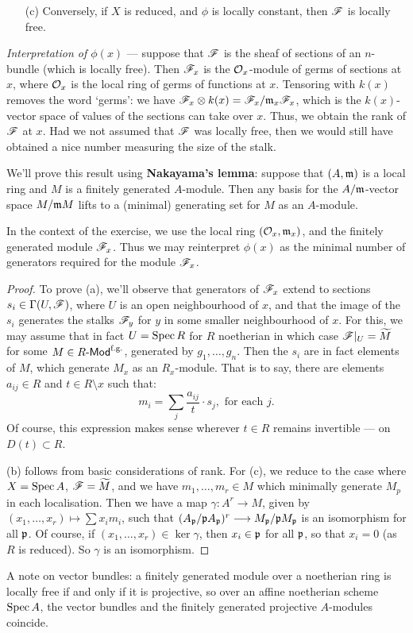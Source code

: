 \documentclass[11pt]{article}
\newcommand{\Index}[1]{\index{#1}#1}
\begin{document}
\begin{itemise}
\begin{enumerate}
\item[(c)] Conversely, if $X$ is reduced, and $\phi$ is locally constant, then
$\mathscr{F}$ is locally free.
\end{enumerate}
\emph{Interpretation of $\phi(x)$} --- suppose that $\mathscr{F}$ is the sheaf of
sections of an $n$-bundle (which is locally free). Then $\mathscr{F}_x$ is the
$\mathcal{O}_x$-module of germs of sections at $x$, where $\mathcal{O}_x$ is the local ring
of germs of functions at $x$. Tensoring with $k(x)$ removes the word `germs': we
have $\mathscr{F}_x\otimes k(x)=\mathscr{F}_x/\mathfrak{m}_x\mathscr{F}_x$, which is the $k(x)$-vector
space of values of the sections can take over $x$. Thus, we obtain the rank of
$\mathscr{F}$ at $x$. Had we not assumed that $\mathscr{F}$ was locally free, then we would
still have obtained a nice number measuring the size of the stalk.

\INDENT We'll prove this result using \textbf{\Index{Nakayama's lemma}}: suppose
that $(A,\mathfrak{m})$ is a local ring and $M$ is a finitely generated $A$-module.
Then any basis for the $A/\mathfrak{m}$-vector space $M/\mathfrak{m} M$ lifts to a (minimal)
generating set for $M$ as an $A$-module.

\INDENT In the context of the exercise, we use the local ring
$(\mathcal{O}_x,\mathfrak{m}_x)$, and the finitely generated module $\mathscr{F}_x$. Thus we may
reinterpret $\phi(x)$ as the minimal number of generators required for the
module $\mathscr{F}_x$.

\begin{proof} To prove (a), we'll observe that generators of $\mathscr{F}_x$ extend to
sections $s_i\in\Gamma(U,\mathscr{F})$, where $U$ is an open neighbourhood of $x$, and
that the image of the $s_i$ generates the stalks $\mathscr{F}_y$ for $y$ in some
smaller neighbourhood of $x$. For this, we may assume that in fact $U=\operatorname{Spec} R$
for $R$ noetherian in which case $\mathscr{F}|_U=\widetilde M$ for some $M\in
R\operatorname{{\mathsf{\!-Mod}}}^\text{f.g.}$, generated by $g_1,\ldots,g_n$. Then the $s_i$ are in
fact elements of $M$, which generate $M_x$ as an $R_x$-module. That is to say,
there are elements $a_{ij}\in R$ and $t\in R\setminus x$ such that:
\[m_i=\sum_{j}\frac{a_{ij}}{t}\cdot s_j, \text{ for each $j$}.\]
Of course, this expression makes sense wherever $t\in R$ remains invertible ---
on $D(t)\subset R$.

(b) follows from basic considerations of rank. For (c), we reduce to the case
where $X=\operatorname{Spec} A$, $\mathscr{F}=\widetilde M$, and we have $m_1,\ldots,m_r\in M$ which
minimally generate $M_p$ in each localisation. Then we have a map $\gamma:A^r\to
M$, given by $(x_1,\ldots,x_r)\mapsto \sum x_im_i$, such that $(A_{\mathfrak{p}}/\mathfrak{p}
A_{\mathfrak{p}})^r\longrightarrow M_{\mathfrak{p}}/\mathfrak{p} M_{\mathfrak{p}}$ is an isomorphism for all $\mathfrak{p}$. Of
course, if $(x_1,\ldots,x_r)\in\ker\gamma$, then $x_i\in\mathfrak{p}$ for all
$\mathfrak{p}$, so that $x_i=0$ (as $R$ is reduced). So $\gamma$ is an isomorphism.
\end{proof}
\item A note on vector bundles: a finitely generated module over a noetherian
ring is locally free if and only if it is projective, so over an affine
noetherian scheme $\operatorname{Spec} A$, the vector bundles and the finitely generated
projective $A$-modules coincide.
\end{itemise}
\end{document}
